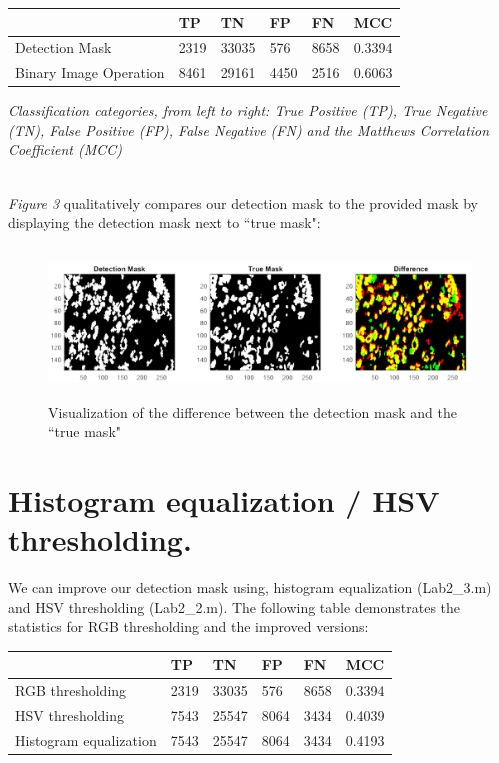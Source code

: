 \documentclass[a4paper,11pt]{article}
\begin{document}
\begin{center}
\setlength\extrarowheight{6pt}\large
\begin{tabular}{|C{3.5cm}|C{1.5cm}|C{1.5cm}|C{1.5cm}|C{1.5cm}|C{1.5cm}|}
 & \textbf{TP} & \textbf{TN} & \textbf{FP} & \textbf{FN} & \textbf{MCC} \\ \hline
Detection Mask & 2319 & 33035 & 576 & 8658 & 0.3394 \\ \hline
Binary Image Operation & 8461 & 29161 & 4450 & 2516 & 0.6063 \\ \hline
\end{tabular}
\end{center}

\par\noindent
\emph{Classification categories, from left to right: True Positive (TP), True Negative (TN), False Positive (FP), False Negative (FN) and the Matthews Correlation Coefficient (MCC)}

 \\
\emph{Figure 3} qualitatively compares our detection mask to the provided mask by displaying the detection mask next to ``true mask":
\begin{figure}[!htb]
  \centering
  \includegraphics[width=16cm, height=4cm]{3.png}
  \caption{\small Visualization of the difference between the detection mask and the ``true mask"}
\end{figure}

\section*{Histogram equalization / HSV thresholding.}

We can improve our detection mask using, histogram equalization (Lab2\_3.m) and HSV thresholding (Lab2\_2.m). The following table demonstrates the statistics for RGB thresholding and the improved versions:
\begin{center}
\setlength\extrarowheight{6pt}\large
\begin{tabular}{|C{4.5cm}|C{1.5cm}|C{1.5cm}|C{1.5cm}|C{1.5cm}|C{1.5cm}|}
 & \textbf{TP} & \textbf{TN} & \textbf{FP} & \textbf{FN} & \textbf{MCC} \\ \hline
RGB thresholding & 2319 & 33035 & 576 & 8658 & 0.3394 \\ \hline
HSV thresholding & 7543 & 25547 & 8064 & 3434 & 0.4039 \\ \hline
Histogram equalization & 7543 & 25547 & 8064 & 3434 & 0.4193 \\ \hline
\end{tabular}
\end{center}


\newpage
\end{document}

